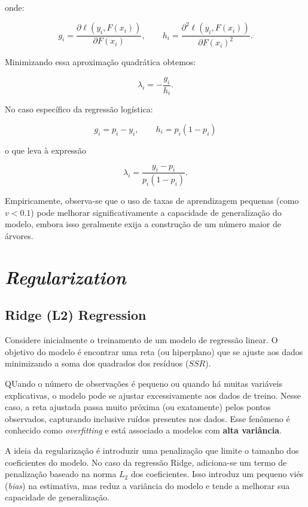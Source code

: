 \documentclass{article}
\begin{document}
onde:

\begin{equation*}
    g_i = \frac{\partial \ell(y_i,F(x_i))}{\partial F(x_i)}, \qquad h_i = \frac{\partial^2 \ell(y_i,F(x_i))}{\partial F(x_i)^2}.
\end{equation*}

Minimizando essa aproximação quadrática obtemos:

\begin{equation*}
    \lambda_i = -\frac{g_i}{h_i}.
\end{equation*}

No caso específico da regressão logística:

\begin{equation*}
    g_i = p_i - y_i, \qquad h_i = p_i(1-p_i)
\end{equation*}

o que leva à expressão

\begin{equation*}
    \lambda_i = \frac{y_i - p_i}{p_i(1-p_i)}.
\end{equation*}

Empiricamente, observa-se que o uso de taxas de aprendizagem pequenas
(como $v < 0.1$) pode melhorar significativamente a capacidade de
generalização do modelo, embora isso geralmente exija a construção
de um número maior de árvores.

\section{\textit{Regularization}}

\subsection{Ridge (L2) Regression}

Considere inicialmente o treinamento de um modelo de regressão linear.
O objetivo do modelo é encontrar uma reta (ou hiperplano) que se ajuste 
aos dados minimizando a soma dos quadrados dos resíduos ($SSR$).

QUando o número de observações é pequeno ou quando há muitas variáveis
explicativas, o modelo pode se ajustar excessivamente aos dados de treino.
Nesse caso, a reta ajustada passa muito próxima (ou exatamente) pelos 
pontos observados, capturando inclusive ruídos presentes nos dados.
Esse fenômeno é conhecido como \textit{overfitting} e está associado 
a modelos com \textbf{alta variância}.

A ideia da regularização é introduzir uma penalização que limite o 
tamanho dos coeficientes do modelo. No caso da regressão Ridge, 
adiciona-se um termo de penalização baseado na norma $L_2$ dos 
coeficientes. Isso introduz um pequeno viés (\textit{bias}) na estimativa,
mas reduz a variância do modelo e tende a melhorar sua capacidade de generalização.
\end{document}
